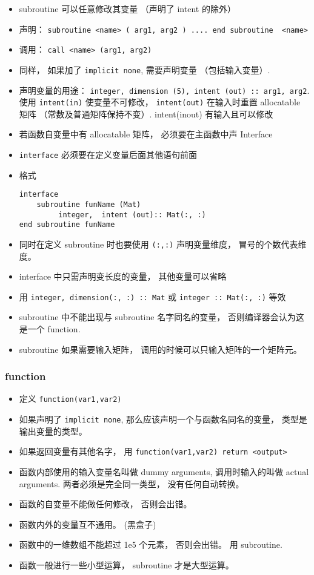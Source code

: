 \begin{itemize}
\item subroutine 可以任意修改其变量 （声明了 intent 的除外）
\item 声明： \verb`subroutine <name> ( arg1, arg2 ) .... end subroutine  <name>`
\item 调用：  \verb`call <name> (arg1, arg2)`
\item 同样， 如果加了 \verb`implicit none`,  需要声明变量 （包括输入变量）.
\item 声明变量的用途： \verb`integer, dimension (5), intent (out) :: arg1, arg2`. 使用 \verb`intent(in)` 使变量不可修改， \verb`intent(out)` 在输入时重置 allocatable 矩阵 （常数及普通矩阵保持不变）. intent(inout) 有输入且可以修改
\item 若函数自变量中有 allocatable 矩阵， 必须要在主函数中声 Interface
\item \verb`interface` 必须要在定义变量后面其他语句前面
\item 格式
\begin{lstlisting}[language=none]
interface
    subroutine funName (Mat)
         integer,  intent (out):: Mat(:, :)
end subroutine funName
\end{lstlisting}
\item 同时在定义 subroutine 时也要使用 \verb`(:,:)` 声明变量维度， 冒号的个数代表维度。
\item interface 中只需声明变长度的变量， 其他变量可以省略
\item 用 \verb|integer, dimension(:, :) :: Mat| 或 \verb|integer :: Mat(:, :)| 等效
\item subroutine 中不能出现与 subroutine 名字同名的变量， 否则编译器会认为这是一个 function.
\item subroutine 如果需要输入矩阵， 调用的时候可以只输入矩阵的一个矩阵元。
\end{itemize}

\subsubsection{function}
\begin{itemize}
\item 定义 \verb`function(var1,var2)`
\item 如果声明了 \verb|implicit none|, 那么应该声明一个与函数名同名的变量， 类型是输出变量的类型。
\item 如果返回变量有其他名字， 用 \verb|function(var1,var2) return <output>|
\item 函数内部使用的输入变量名叫做 dummy arguments, 调用时输入的叫做 actual arguments. 两者必须是完全同一类型， 没有任何自动转换。
\item 函数的自变量不能做任何修改， 否则会出错。
\item 函数内外的变量互不通用。 (黑盒子)
\item 函数中的一维数组不能超过 1e5 个元素， 否则会出错。 用 subroutine.
\item 函数一般进行一些小型运算， subroutine 才是大型运算。
\end{itemize}

